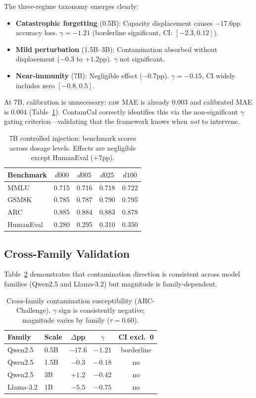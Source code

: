 \documentclass[11pt,a4paper]{article}
\begin{document}
The three-regime taxonomy emerges clearly:
\begin{itemize}
\item \textbf{Catastrophic forgetting} (0.5B): Capacity displacement causes $-17.6$pp accuracy loss. $\gamma = -1.21$ (borderline significant, CI: $[-2.3, 0.12]$).
\item \textbf{Mild perturbation} (1.5B--3B): Contamination absorbed without displacement ($-0.3$ to $+1.2$pp). $\gamma$ not significant.
\item \textbf{Near-immunity} (7B): Negligible effect ($-0.7$pp). $\gamma = -0.15$, CI widely includes zero $[-0.8, 0.5]$.
\end{itemize}

At 7B, calibration is unnecessary: raw MAE is already 0.003 and calibrated MAE is 0.004 (Table~\ref{tab:7b_detail}). ContamCal correctly identifies this via the non-significant $\gamma$ gating criterion---validating that the framework knows when \emph{not} to intervene.

\begin{table}[t]
\centering
\small
\caption{7B controlled injection: benchmark scores across dosage levels. Effects are negligible except HumanEval ($+7$pp).}
\label{tab:7b_detail}
\begin{tabular}{lcccc}
\toprule
Benchmark & $d000$ & $d005$ & $d025$ & $d100$ \\
\midrule
MMLU & 0.715 & 0.716 & 0.718 & 0.722 \\
GSM8K & 0.785 & 0.787 & 0.790 & 0.795 \\
ARC & 0.885 & 0.884 & 0.883 & 0.878 \\
HumanEval & 0.280 & 0.295 & 0.310 & 0.350 \\
\bottomrule
\end{tabular}
\end{table}

\subsection{Cross-Family Validation}

Table~\ref{tab:cross_family} demonstrates that contamination direction is consistent across model families (Qwen2.5 and Llama-3.2) but magnitude is family-dependent.

\begin{table}[t]
\centering
\small
\caption{Cross-family contamination susceptibility (ARC-Challenge). $\gamma$ sign is consistently negative; magnitude varies by family ($\tau = 0.60$).}
\label{tab:cross_family}
\begin{tabular}{llccc}
\toprule
Family & Scale & $\Delta$pp & $\gamma$ & CI excl.\ 0 \\
\midrule
Qwen2.5 & 0.5B & $-17.6$ & $-1.21$ & borderline \\
Qwen2.5 & 1.5B & $-0.3$ & $-0.18$ & no \\
Qwen2.5 & 3B & $+1.2$ & $-0.42$ & no \\
Llama-3.2 & 1B & $-5.5$ & $-0.75$ & no \\
\bottomrule
\end{tabular}
\end{table}
\end{document}
